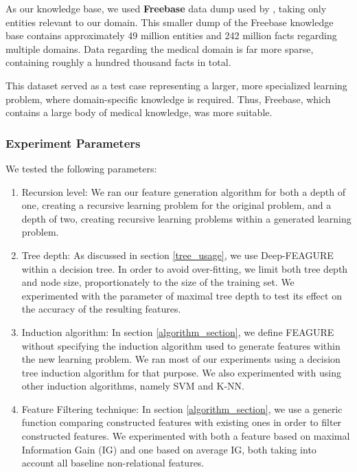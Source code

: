 \documentclass[twoside,11pt]{article}
\theoremstyle{definition}
\begin{document}
\begin{enumerate}
	As our knowledge base, we used \textbf{Freebase} data dump used by , taking only entities relevant to our domain. This smaller dump of the Freebase knowledge base contains approximately 49 million entities and 242 million facts regarding multiple domains. Data regarding the medical domain is far more sparse, containing roughly a hundred thousand facts in total.
	
	This dataset served as a test case representing a larger, more specialized learning problem, where domain-specific knowledge is required. Thus, Freebase, which contains a large body of medical knowledge, was more suitable. 
\end{enumerate}

\subsubsection{Experiment Parameters}

We tested the following parameters:
\begin{enumerate}
	\item Recursion level: We ran our feature generation algorithm for both a depth of one, creating a recursive learning problem for the original problem, and a depth of two, creating recursive learning problems within a generated learning problem. 
	\item Tree depth: As discussed in section \ref{tree_usage}, we use Deep-FEAGURE within a decision tree. In order to avoid over-fitting, we limit both tree depth and node size, proportionately to the size of the training set. We experimented with the parameter of maximal tree depth to test its effect on the accuracy of the resulting features.
	\item Induction algorithm: In section \ref{algorithm_section}, we define FEAGURE without specifying the induction algorithm used to generate features within the new learning problem. We ran most of our experiments using a decision tree induction algorithm for that purpose. We also experimented with using other induction algorithms, namely SVM and K-NN.
	\item Feature Filtering technique: In section \ref{algorithm_section}, we use a generic function comparing constructed features with existing ones in order to filter constructed features. We experimented with both a feature based on maximal Information Gain (IG) and one based on average IG, both taking into account all baseline non-relational features.
\end{enumerate}
\end{document}

